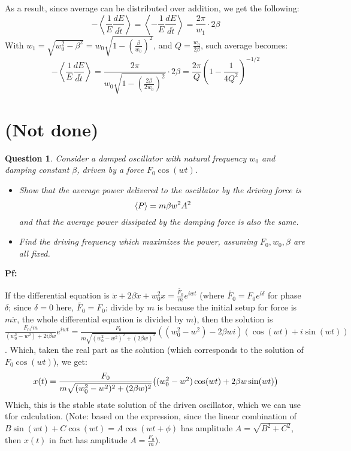 \documentclass{article}
\newtheorem{question}{Question}
\DeclarePairedDelimiter{\paran}{(}{)}%
\DeclarePairedDelimiter{\bracket}{\langle}{\rangle}
\begin{document}
As a result, since average can be distributed over addition, we get the following:
\begin{equation}
    -\left<\frac{1}{E}\frac{dE}{d\tilde{t}}\right>=\left<-\frac{1}{E}\frac{dE}{d\tilde{t}}\right> = \frac{2\pi}{w_1}\cdot 2\beta
\end{equation}
With $w_1 = \sqrt{w_0^2-\beta^2} = w_0\sqrt{1-\left(\frac{\beta}{w_0}\right)^2}$, and $Q=\frac{w_0}{2\beta}$, such average becomes:
\begin{equation}
    -\left<\frac{1}{E}\frac{dE}{d\tilde{t}}\right> = \frac{2\pi}{w_0\sqrt{1-\left(\frac{2\beta}{2w_0}\right)^2}}\cdot 2\beta  = \frac{2\pi}{Q}\left(1-\frac{1}{4Q^2}\right)^{-1/2}
\end{equation}

\break

\section{(Not done)}
\begin{question}\label{q3}
    Consider a damped oscillator with natural frequency $w_0$ and damping constant $\beta$, driven by a force $F_0\cos(wt)$.
    \begin{itemize}
        \item[(a)] Show that the average power delivered to the oscillator by the driving force is 
        $$\bracket*{P}=m\beta w^2A^2$$
        and that the average power dissipated by the damping force is also the same.
        \item[(b)] Find the driving frequency which maximizes the power, assuming $F_0, w_0, \beta$ are all fixed.
    \end{itemize}
\end{question}

\textbf{Pf:}

If the differential equation is $\ddot x+2\beta \dot x + w_0^2x = \frac{\tilde{F_0}}{m}e^{iwt}$ (where $\tilde{F_0}=F_0e^{i\delta}$ for phase $\delta$; since $\delta=0$ here, $\tilde{F_0}=F_0$; divide by $m$ is because the initial setup for force is $m\ddot x$, the whole differential equation is divided by $m$), then the solution is $\frac{F_0/m}{(w_0^2-w^2)+2i\beta w}e^{iwt} = \frac{F_0}{m\sqrt{(w_0^2-w^2)^2+(2\beta w)^2}}((w_0^2-w^2)-2\beta wi)(\cos(wt)+i\sin(wt))$. Which, taken the real part as the solution (which corresponds to the solution of $F_0\cos(wt)$), we get:
\begin{equation}
    x(t) = \frac{F_0}{m\sqrt{(w_0^2-w^2)^2+(2\beta w)^2}}\paran*{(w_0^2-w^2)\cos(wt)+2\beta w\sin(wt)}
\end{equation}
Which, this is the stable state solution of the driven oscillator, which we can use tfor calculation. (Note: based on the expression, since the linear combination of $B\sin(wt)+C\cos(wt)=A\cos(wt+\phi)$ has amplitude $A=\sqrt{B^2+C^2}$, then $x(t)$ in fact has amplitude $A=\frac{F_0}{m}$).
\end{document}
